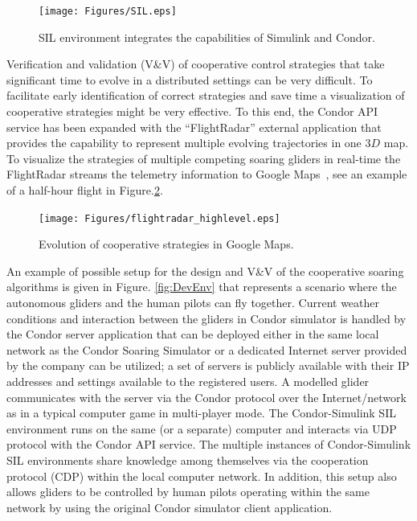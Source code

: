 \documentclass[letterpaper, 10 pt, conference]{ieeeconf}  %
\begin{document}
\begin{figure}[thpb]
  \centering
  \texttt{[image: Figures/SIL.eps]}
  \caption{SIL environment integrates the capabilities of Simulink and Condor.}
  \label{fig:SIL}
\end{figure}

Verification and validation (V\&V) of cooperative control strategies that take significant time to evolve in a distributed settings can be very difficult. To facilitate early identification of correct strategies and save time a visualization of cooperative strategies might be very effective. To this end, the Condor API service has been expanded with the ``FlightRadar'' external application that provides the capability to represent multiple evolving trajectories in one $3D$ map. To visualize the strategies of multiple competing soaring gliders in real-time the FlightRadar streams the telemetry information to Google Maps~\cite{GoogleMaps:2013:Online}, see an example of a half-hour flight in Figure.\ref{fig:FlightRadar}.
\begin{figure}[thpb]
  \centering
  \texttt{[image: Figures/flightradar\_highlevel.eps]}
  \caption{Evolution of cooperative strategies in Google Maps.}
  \label{fig:FlightRadar}
\end{figure}

An example of possible setup for the design and V\&V of the cooperative soaring algorithms is given in Figure. \ref{fig:DevEnv} that represents a scenario where the autonomous gliders and the human pilots can fly together. Current weather conditions and interaction between the gliders in Condor simulator is handled by the Condor server application that can be deployed either in the same local network as the Condor Soaring Simulator or a dedicated Internet server provided by the company can be utilized; a set of servers is publicly available with their IP addresses and settings available to the registered users. A modelled glider communicates with the server via the Condor protocol over the Internet/network as in a typical computer game in multi-player mode. The Condor-Simulink SIL environment runs on the same (or a separate) computer and interacts via UDP protocol with the Condor API service. The multiple instances of Condor-Simulink SIL environments share knowledge among themselves via the cooperation protocol (CDP) within the local computer network. In addition, this setup also allows gliders to be controlled by human pilots operating within the same network by using the original Condor simulator client application.
\end{document}
